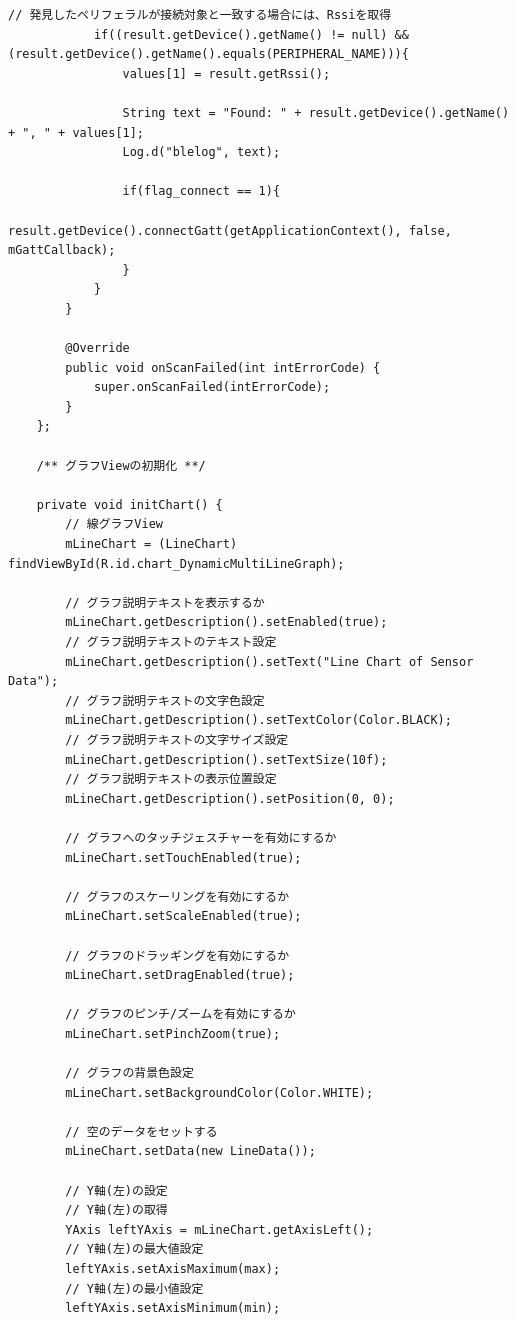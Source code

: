 \documentclass[dvipdfmx,autodetect-engine,titlepage]{jsarticle}
\begin{document}
\begin{lstlisting}[caption=Java.py,label=Java]
            // 発見したペリフェラルが接続対象と一致する場合には、Rssiを取得
            if((result.getDevice().getName() != null) && (result.getDevice().getName().equals(PERIPHERAL_NAME))){
                values[1] = result.getRssi();

                String text = "Found: " + result.getDevice().getName() + ", " + values[1];
                Log.d("blelog", text);

                if(flag_connect == 1){
                    result.getDevice().connectGatt(getApplicationContext(), false, mGattCallback);
                }
            }
        }

        @Override
        public void onScanFailed(int intErrorCode) {
            super.onScanFailed(intErrorCode);
        }
    };

    /** グラフViewの初期化 **/

    private void initChart() {
        // 線グラフView
        mLineChart = (LineChart) findViewById(R.id.chart_DynamicMultiLineGraph);

        // グラフ説明テキストを表示するか
        mLineChart.getDescription().setEnabled(true);
        // グラフ説明テキストのテキスト設定
        mLineChart.getDescription().setText("Line Chart of Sensor Data");
        // グラフ説明テキストの文字色設定
        mLineChart.getDescription().setTextColor(Color.BLACK);
        // グラフ説明テキストの文字サイズ設定
        mLineChart.getDescription().setTextSize(10f);
        // グラフ説明テキストの表示位置設定
        mLineChart.getDescription().setPosition(0, 0);

        // グラフへのタッチジェスチャーを有効にするか
        mLineChart.setTouchEnabled(true);

        // グラフのスケーリングを有効にするか
        mLineChart.setScaleEnabled(true);

        // グラフのドラッギングを有効にするか
        mLineChart.setDragEnabled(true);

        // グラフのピンチ/ズームを有効にするか
        mLineChart.setPinchZoom(true);

        // グラフの背景色設定
        mLineChart.setBackgroundColor(Color.WHITE);

        // 空のデータをセットする
        mLineChart.setData(new LineData());

        // Y軸(左)の設定
        // Y軸(左)の取得
        YAxis leftYAxis = mLineChart.getAxisLeft();
        // Y軸(左)の最大値設定
        leftYAxis.setAxisMaximum(max);
        // Y軸(左)の最小値設定
        leftYAxis.setAxisMinimum(min);


\end{lstlisting}
\end{document}

